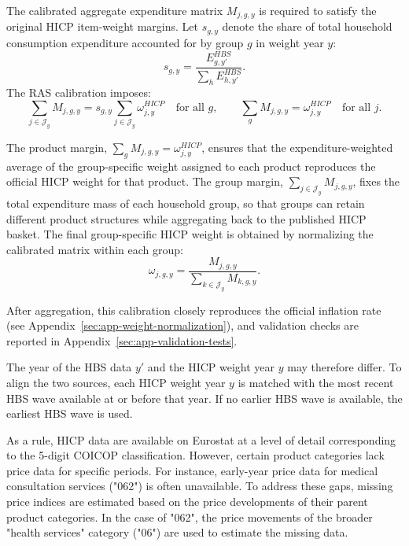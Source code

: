 \documentclass[11pt]{article}
\begin{document}
The calibrated aggregate expenditure matrix $M_{j,g,y}$ is required to satisfy the original HICP
item-weight margins. Let $s_{g,y}$ denote the share of total household consumption expenditure
accounted for by group $g$ in weight year $y$:
\begin{equation}
s_{g,y}
=
\frac{E^{HBS}_{g,y'}}{\sum_h E^{HBS}_{h,y'}}.
\end{equation}
The RAS calibration imposes:
\begin{equation}
\sum_{j \in \mathcal{J}_y} M_{j,g,y}
=
s_{g,y}\sum_{j \in \mathcal{J}_y}\omega^{HICP}_{j,y}
\quad \text{for all } g,
\qquad
\sum_g M_{j,g,y}
=
\omega^{HICP}_{j,y}
\quad \text{for all } j.
\end{equation}

The product margin, $\sum_g M_{j,g,y}=\omega^{HICP}_{j,y}$, ensures that the expenditure-weighted
average of the group-specific weight assigned to each product reproduces the official HICP weight
for that product. The group margin, $\sum_{j \in \mathcal{J}_y} M_{j,g,y}$, fixes the total
expenditure mass of each household group, so that groups can retain different product structures
while aggregating back to the published HICP basket. The final group-specific HICP weight is
obtained by normalizing the calibrated matrix within each group:
\begin{equation}
\omega_{j,g,y}
=
\frac{M_{j,g,y}}{\sum_{k \in \mathcal{J}_y}M_{k,g,y}}.
\end{equation}

After aggregation, this calibration closely reproduces the official inflation rate (see
Appendix~\ref{sec:app-weight-normalization}), and validation checks are reported in
Appendix~\ref{sec:app-validation-tests}.


The year of the HBS data $y'$ and the HICP weight year $y$ may therefore differ. To align the two sources, each HICP
weight year $y$ is matched with the most recent HBS wave available at or before that year. If no
earlier HBS wave is available, the earliest HBS wave is used.

As a rule, HICP data are available on Eurostat at a level of detail corresponding to the 5-digit
COICOP classification. However, certain product categories lack price data for specific periods. For
instance, early-year price data for medical consultation services ("062") is often unavailable. To
address these gaps, missing price indices are estimated based on the price developments of their
parent product categories. In the case of "062", the price movements of the broader "health
services" category ("06") are used to estimate the missing data.
\end{document}
